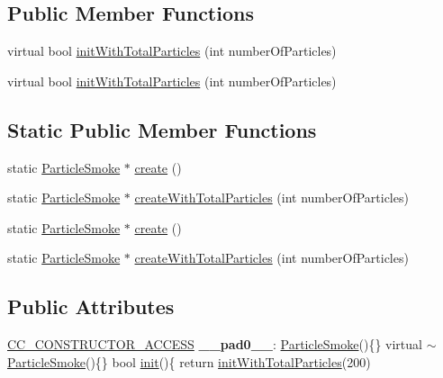 \subsection*{Public Member Functions}
\begin{DoxyCompactItemize}
\item 
virtual bool \hyperlink{classParticleSmoke_a15a46a667c6fb570023fe68d94296b3e}{init\+With\+Total\+Particles} (int number\+Of\+Particles)
\item 
virtual bool \hyperlink{classParticleSmoke_ad06f80d20c4f8fec1d7d56beb478b72d}{init\+With\+Total\+Particles} (int number\+Of\+Particles)
\end{DoxyCompactItemize}
\subsection*{Static Public Member Functions}
\begin{DoxyCompactItemize}
\item 
static \hyperlink{classParticleSmoke}{Particle\+Smoke} $\ast$ \hyperlink{classParticleSmoke_a489f1b9fc63bc0ddbf0199b68d7d5a57}{create} ()
\item 
static \hyperlink{classParticleSmoke}{Particle\+Smoke} $\ast$ \hyperlink{classParticleSmoke_a9fa8e1c0c072063c3879bfa4b142bb0b}{create\+With\+Total\+Particles} (int number\+Of\+Particles)
\item 
static \hyperlink{classParticleSmoke}{Particle\+Smoke} $\ast$ \hyperlink{classParticleSmoke_ad56cf62c4ccfadea9c795a852ca88f3e}{create} ()
\item 
static \hyperlink{classParticleSmoke}{Particle\+Smoke} $\ast$ \hyperlink{classParticleSmoke_af9de0fb939e04b27d7393e4ed60a6072}{create\+With\+Total\+Particles} (int number\+Of\+Particles)
\end{DoxyCompactItemize}
\subsection*{Public Attributes}
\begin{DoxyCompactItemize}
\item 
\mbox{\label{classParticleSmoke_a5174da72f297350e2e80fd6a49aeffa5}} 
\hyperlink{_2cocos2d_2cocos_2base_2ccConfig_8h_a25ef1314f97c35a2ed3d029b0ead6da0}{C\+C\+\_\+\+C\+O\+N\+S\+T\+R\+U\+C\+T\+O\+R\+\_\+\+A\+C\+C\+E\+SS} {\bfseries \+\_\+\+\_\+pad0\+\_\+\+\_\+}\+: \hyperlink{classParticleSmoke}{Particle\+Smoke}()\{\} virtual $\sim$\hyperlink{classParticleSmoke}{Particle\+Smoke}()\{\} bool \hyperlink{classParticleSystem_a65c05b30432f6e8aeb45ba018f3a8d3f}{init}()\{ return \hyperlink{classParticleSmoke_a15a46a667c6fb570023fe68d94296b3e}{init\+With\+Total\+Particles}(200)
\end{DoxyCompactItemize}
